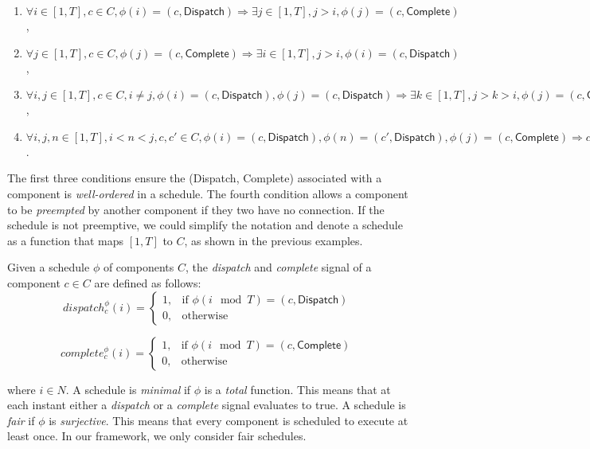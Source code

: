 \begin{enumerate}
	\item $ \forall i\in [1,T], c\in C, \phi(i) = (c, \textsf{Dispatch}) \Rightarrow \exists j\in [1,T], j > i, \phi(j) =  (c, \textsf{Complete}) $,
	\item $ \forall j\in [1,T], c\in C, \phi(j) = (c, \textsf{Complete}) \Rightarrow \exists i\in [1,T], j > i, \phi(i) =  (c, \textsf{Dispatch}) $,
	\item $ \forall i, j\in [1,T], c\in C, i \neq j, \phi(i) = (c, \textsf{Dispatch}), \phi(j) = (c, \textsf{Dispatch}) \Rightarrow \exists k\in [1,T], j >k> i, \phi(j) =  (c, \textsf{Complete}) $,
	\item $ \forall i, j, n\in [1,T], i < n < j, c, c'\in C, \phi(i) = (c, \textsf{Dispatch}), \phi(n) = (c', \textsf{Dispatch}), \phi(j) = (c, \textsf{Complete}) \Rightarrow c, c' \text{ are not connected, and }\exists m\in [1,T], n < m < j, \phi(m) =  (c', \textsf{Complete}) $.
\end{enumerate}

The first three conditions ensure the (\textsf{Dispatch}, \textsf{Complete}) associated with a component is \emph{well-ordered} in a schedule. 
The fourth condition allows a component to be \emph{preempted} by another component if they two have no connection.
If the schedule is not preemptive, we could simplify the notation and denote a schedule as a function that maps $[1, T]$ to $C$, as shown in the previous examples.

Given a schedule $\phi$ of components $C$, the \emph{dispatch} and \emph{complete} signal of a component $c \in C$ are defined as follows: 
\begin{equation*}
\label{eqn:dispatch}
    dispatch_c^\phi(i) =
    \begin{cases}
      1, & \text{if } \phi(i \mod T) = (c, \textsf{Dispatch}) \\
      0, & \text{otherwise}
    \end{cases}
\end{equation*}

\begin{equation*}
\label{eqn:complete}
    complete_c^\phi(i) =
    \begin{cases}
      1, & \text{if } \phi(i \mod T) = (c, \textsf{Complete}) \\
      0, & \text{otherwise}
    \end{cases}
\end{equation*}

where $i \in N$. 
A schedule is \emph{minimal} if $\phi$ is a \emph{total} function. This means that at each instant either a \emph{dispatch} or a \emph{complete} signal evaluates to true. 
A schedule is \emph{fair} if $\phi$ is \emph{surjective}. This means that every component is scheduled to execute at least once.
In our framework, we only consider fair schedules.

